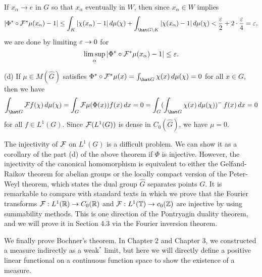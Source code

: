 \documentclass[a4paper]{article}
\begin{document}
\begin{pf}
If $x_\alpha\to e$ in $G$ so that $x_\alpha$ eventually in $W$, then since $x_\alpha\in W$ implies
\[|\Phi^*\circ\cF^*\mu(x_\alpha)-1|\le\int_K|\chi(x_\alpha)-1|\,d\mu(\chi)+\int_{\hat G\setminus K}|\chi(x_\alpha)-1|\,d\mu(\chi)<\frac\e2+2\cdot\frac\e4=\e,\]
we are done by limiting $\varepsilon\to0$ for
\[\limsup_\alpha|\Phi^*\circ\mathcal{F}^*\mu(x_\alpha)-1|\le\varepsilon.\]

(d)
If $\mu\in M(\hat G)$ satisfies $\Phi^*\circ\cF^*\mu(x)=\int_{\hat G}\chi(x)\,d\mu(\chi)=0$ for all $x\in G$, then we have
\[\int_{\hat G}\cF f(\chi)\,d\mu(\chi)=\int_G\cF\mu(\Phi(x))f(x)\,dx=0=\int_G(\int_{\hat G}\chi(x)\,d\mu(\chi))^-\,f(x)\,dx=0\]
for all $f\in L^1(G)$.
Since $\mathcal{F}(L^1(G))$ is dense in $C_0(\hat G)$, we have $\mu=0$.
\end{pf}

\begin{rmk}
The injectivity of $\mathcal{F}$ on $L^1(G)$ is a difficult problem.
We can show it as a corollary of the part (d) of the above theorem if $\Phi$ is injective.
However, the injectivity of the canonical homomorphism is equivalent to either the Gelfand-Raikov theorem for abelian groups or the locally compact version of the Peter-Weyl theorem, which states the dual group $\hat G$ separates points $G$.
It is remarkable to compare with standard texts in which we prove that the Fourier transforms $\mathcal{F}:L^1(\mathbb{R})\to C_0(\mathbb{R})$ and $\mathcal{F}:L^1(\mathbb{T})\to c_0(\mathbb{Z})$ are injective by using summability methods.
This is one direction of the Pontryagin duality theorem, and we will prove it in Section 4.3 via the Fourier inversion theorem.
\end{rmk}

We finally prove Bochner's theorem.
In Chapter 2 and Chapter 3, we constructed a measure indirectly as a weak$^*$ limit, but here we will directly define a positive linear functional on a continuous function space to show the existence of a measure.
\end{document}
